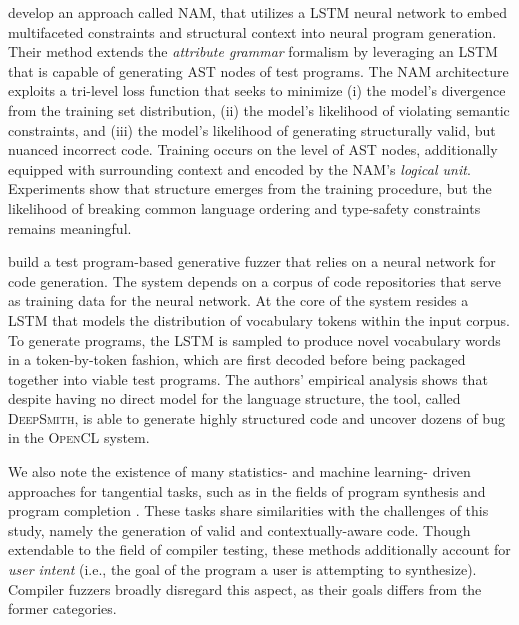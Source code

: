 
\citet{amodio2017neural} develop an approach called \gls{NAM},
that utilizes a \gls{LSTM} \cite{hochreiter1997long}
neural network to embed multifaceted constraints
and structural context into neural program generation.
Their method extends the \textit{attribute grammar}
formalism by leveraging an \gls{LSTM} that is capable
of generating \gls{AST} nodes of test programs.
The \gls{NAM} architecture exploits a tri-level
loss function that seeks to minimize 
(i) the model's divergence from the training set distribution,
(ii) the model's likelihood of violating semantic constraints, and
(iii) the model's likelihood of generating structurally valid, but nuanced incorrect code.
Training occurs on the level of \gls{AST} nodes,
additionally equipped with surrounding context and encoded
by the \gls{NAM}'s \textit{logical unit}.
Experiments show that structure emerges from the training procedure,
but the likelihood of breaking common language ordering and type-safety
constraints remains meaningful.

\citet{cummins2018compiler} build a test program-based generative fuzzer
that relies on a neural network for code generation.
The system depends on a corpus of code repositories
that serve as training data for the neural network.
At the core of the system resides a \gls{LSTM}
that models the distribution of vocabulary tokens within the input corpus.
To generate programs, the \gls{LSTM} is sampled to produce
novel vocabulary words in a token-by-token fashion,
which are first decoded before being packaged together into viable test programs.
The authors' empirical analysis shows that despite having no direct
model for the language structure, the tool, called \textsc{DeepSmith},
is able to generate highly structured code and uncover dozens of bug in the
\textsc{OpenCL} system.

We also note the existence of many statistics- and machine learning-
driven approaches for tangential tasks, such as in the fields of
program synthesis \cite{gulwani2017program} and
program completion \cite{raychev2014code}.
These tasks share similarities with the challenges of this
study, namely the generation of valid and contextually-aware code.
Though extendable to the field of compiler testing,
these methods additionally account for \textit{user intent}
(i.e., the goal of the program a user is attempting to synthesize).
Compiler fuzzers broadly disregard this aspect, as their goals differs from 
the former categories.

